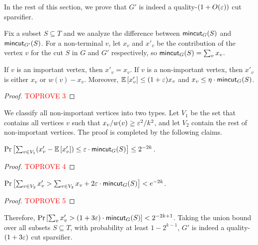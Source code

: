 In the rest of this section, we prove that $G'$ is indeed a quality-$(1+O({\varepsilon}))$ cut sparsifier.

Fix a subset $S\subseteq T$ and we analyze the difference between $\mathsf{mincut}_G(S)$ and $\mathsf{mincut}_{G'}(S)$.
For a non-terminal $v$, let $x_v$ and $x'_v$ be the contribution of the vertex $v$ for the cut $S$ in $G$ and $G'$ respectively, so $\mathsf{mincut}_G(S) = \sum_v x_v$. 

\begin{observation}
If $v$ is an important vertex, then $x'_v=x_v$. If $v$ is a non-important vertex, then $x'_v$ is either $x_v$ or $w(v)-x_v$. Moreover, ${\mathbb{E}}\left[ x'_v \right] \le (1+{\varepsilon})x_v$ and $x_v \le \eta \cdot \mathsf{mincut}_G(S)$.
\end{observation}
\begin{proof}\textcolor{red}{TOPROVE 3}\end{proof}

We classify all non-important vertices into two types. 
Let $V_1$ be the set that contains all vertices $v$ such that $x_v/w(v) \ge {\varepsilon}^2/k^2$, and let $V_2$ contain the rest of non-important vertices. 
The proof is completed by the following claims.

\begin{claim}
$\mathrm{Pr}\left[ \sum_{v \in V_1} (x'_v - {\mathbb{E}}\left[ x'_v \right]) \le {\varepsilon}\cdot \mathsf{mincut}_G(S) \right] \le 2^{-2k}$.
\end{claim}
\begin{proof}\textcolor{red}{TOPROVE 4}\end{proof}


\begin{claim}
$\mathrm{Pr}\left[ \sum_{v\in V_2} x'_v > \sum_{v\in V_2} x_v + 2{\varepsilon}\cdot \mathsf{mincut}_G(S) \right] <e^{-2k}$.
\end{claim}
\begin{proof}\textcolor{red}{TOPROVE 5}\end{proof}

Therefore, $\mathrm{Pr}\left[ \sum_v x'_v > (1+3{\varepsilon})\cdot\mathsf{mincut}_G(S) \right] < 2^{-2k+1}$. Taking the union bound over all subsets $S\subseteq T$, with probability at least $1-2^{k-1}$, $G'$ is indeed a quality-$(1+3{\varepsilon})$ cut sparsifier.






























